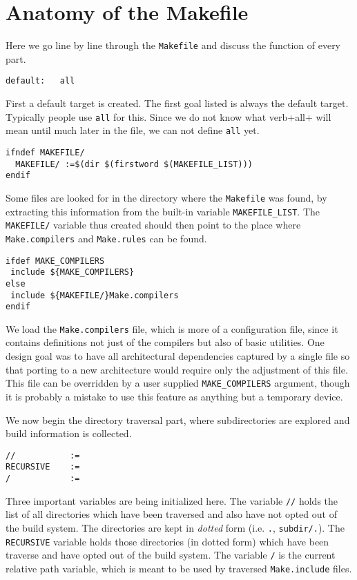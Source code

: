 \documentclass{article}
\begin{document}
\section{Anatomy of the Makefile}

Here we go line by line through the \verb+Makefile+ and discuss the function
of every part.

\begin{verbatim}
default:   all
\end{verbatim}
First a default target is created.  The first goal listed is always
the default target.  Typically people use \verb+all+ for this.  Since
we do not know what verb+all+ will mean until much later in the file,
we can not define \verb+all+ yet.

\begin{verbatim}
ifndef MAKEFILE/
  MAKEFILE/ :=$(dir $(firstword $(MAKEFILE_LIST)))
endif
\end{verbatim}
Some files are looked for in the directory where the
\verb+Makefile+ was found, by extracting this information from the
built-in variable \verb+MAKEFILE_LIST+.  The \verb+MAKEFILE/+ variable
thus created should then point to the place where \verb+Make.compilers+
and \verb+Make.rules+ can be found.

\begin{verbatim}
ifdef MAKE_COMPILERS
 include ${MAKE_COMPILERS}
else
 include ${MAKEFILE/}Make.compilers
endif
\end{verbatim}
We load the \verb+Make.compilers+ file, which is more of a
configuration file, since it contains definitions not just of the
compilers but also of basic utilities.  One design goal was to have
all architectural dependencies captured by a single file so
that porting to a new architecture would require only the adjustment
of this file.  This file can be overridden by a user supplied
\verb+MAKE_COMPILERS+ argument, though it is probably a mistake
to use this feature as anything but a temporary device.

We now begin the directory traversal part, where subdirectories are
explored and build information is collected.

\begin{verbatim}
//           :=
RECURSIVE    :=
/            :=
\end{verbatim}
Three important variables are being initialized here.  The variable
\verb+//+ holds the list of all directories which have been traversed
and also have not opted out of the build system.  The directories are
kept in {\em dotted} form (i.e. \verb+.+, \verb+subdir/.+).  The
\verb+RECURSIVE+ variable holds those directories (in dotted form)
which have been traverse and have opted out of the build system.  The
variable \verb+/+ is the current relative path variable, which is
meant to be used by traversed \verb+Make.include+ files.
\end{document}
